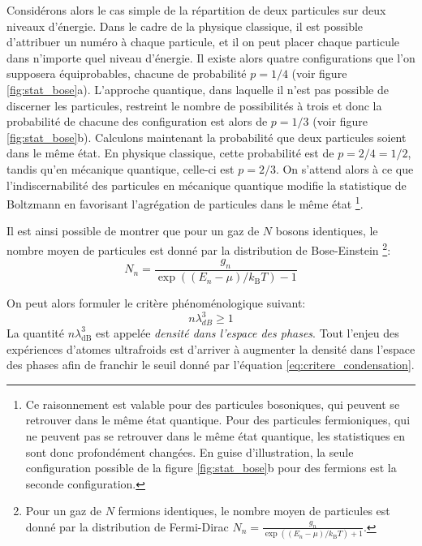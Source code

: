 Considérons alors le cas simple de la répartition de deux particules sur deux niveaux d'énergie. Dans le cadre de la physique classique, il est possible d'attribuer un numéro à chaque particule, et il on peut placer chaque particule dans n'importe quel niveau d'énergie. Il existe alors quatre configurations que l'on supposera équiprobables, chacune de probabilité $p=1/4$ (voir figure \ref{fig:stat_bose}a). L'approche quantique, dans laquelle il n'est pas possible de discerner les particules, restreint le nombre de possibilités à trois et donc la probabilité de chacune des configuration est alors de $p=1/3$ (voir figure \ref{fig:stat_bose}b). Calculons maintenant la probabilité que deux particules soient dans le même état. En physique classique, cette probabilité est de $p=2/4=1/2$, tandis qu'en mécanique quantique, celle-ci est $p=2/3$. On s'attend alors à ce que l'indiscernabilité des particules en mécanique quantique modifie la statistique de Boltzmann en favorisant l'agrégation de particules dans le même état \footnote{Ce raisonnement est valable pour des particules bosoniques, qui peuvent se retrouver dans le même état quantique. Pour des particules fermioniques, qui ne peuvent pas se retrouver dans le même état quantique, les statistiques en sont donc profondément changées. En guise d'illustration, la seule configuration possible de la figure \ref{fig:stat_bose}b pour des fermions est la seconde configuration.}.

Il est ainsi possible de montrer que pour un gaz de $N$ bosons identiques, le nombre moyen de particules est donné par la distribution de Bose-Einstein \footnote{Pour un gaz de $N$ fermions identiques, le nombre moyen de particules est donné par la distribution de Fermi-Dirac $ N_n=\frac{g_n}{\exp{\left( (E_n-\mu)/k_{\mathrm{B}}T\right)}+1}$.}:\citep{diu1989elements}
\begin{equation}
N_n=\frac{g_n}{\exp{\left( (E_n-\mu)/k_{\mathrm{B}}T \right)}-1}
\end{equation}

On peut alors formuler le critère phénoménologique suivant:
\begin{equation}
n \lambda_{dB}^3 \geq 1
\label{eq:critere_condensation}
\end{equation}
La quantité $n \lambda_{\mathrm{dB}}^3$ est appelée \emph{densité dans l'espace des phases}. Tout l'enjeu des expériences d'atomes ultrafroids est d'arriver à augmenter la densité dans l'espace des phases afin de franchir le seuil donné par l'équation \ref{eq:critere_condensation}.

